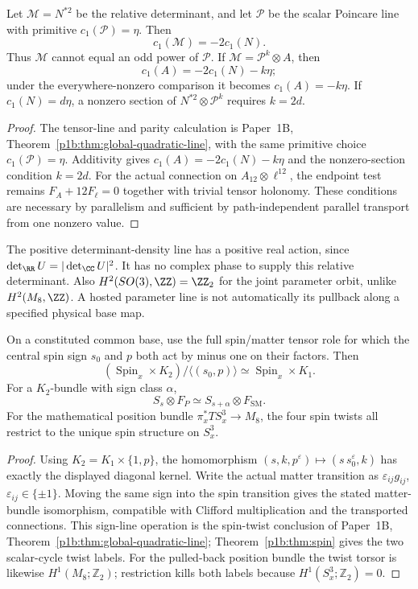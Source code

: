 \documentclass[12pt,a4paper]{article}
\begin{document}
\begin{proposition}
\label{p5:prop:relative-determinant-poincare-parity}
Let \(\mathcal M=N^{*2}\) be the relative determinant,
and let \(\mathcal P\) be the scalar Poincare line with
primitive \(c_1(\mathcal P)=\eta\).  Then
\[
 c_1(\mathcal M)=-2c_1(N).
\]
Thus \(\mathcal M\) cannot equal an odd power of
\(\mathcal P\).  If
\(\mathcal M=\mathcal P^k\otimes A\), then
\[
 c_1(A)=-2c_1(N)-k\eta;
\]
under the everywhere-nonzero comparison it becomes
\(c_1(A)=-k\eta\).  If \(c_1(N)=d\eta\), a nonzero
section of \(N^{*2}\otimes\mathcal P^k\) requires
\(k=2d\).
\end{proposition}
\begin{proof}
The tensor-line and parity calculation is Paper~1B,
Theorem~\ref{p1b:thm:global-quadratic-line}, with the same primitive
choice $c_1(\mathcal P)=\eta$. Additivity gives
$c_1(A)=-2c_1(N)-k\eta$ and the nonzero-section condition $k=2d$.
For the actual connection on $A_{12}\otimes\ell^{12}$, the endpoint
test remains $F_A+12F_\ell=0$ together with trivial tensor holonomy.
These conditions are necessary by parallelism and sufficient by
path-independent parallel transport from one nonzero value.
\end{proof}

The positive determinant-density line has a positive real
action, since \(\det_{\RR}U=|\det_{\CC}U|^2\).
It has no complex phase to supply this relative
determinant.  Also \(H^2(SO(3),\ZZ)=\ZZ_2\) for the
joint parameter orbit, unlike \(H^2(M_8,\ZZ)\).
A hosted parameter line is not automatically its
pullback along a specified physical base map.

\begin{proposition}
\label{p5:prop:quadratic-sign-spin-matter-incidence}
On a constituted common base, use the full spin/matter
tensor role for which the central spin sign \(s_0\)
and \(p\) both act by minus one on their factors.
Then
\[
 (\operatorname{Spin}_x\times K_2)/\langle(s_0,p)\rangle
       \simeq\operatorname{Spin}_x\times K_1.
\]
For a \(K_2\)-bundle with sign class \(\alpha\),
\[
 S_s\otimes F_P\simeq S_{s+\alpha}\otimes F_{\mathrm{SM}}.
\]
For the mathematical position bundle
\(\pi_x^*TS_x^3\to M_8\), the four spin twists all
restrict to the unique spin structure on \(S_x^3\).
\end{proposition}
\begin{proof}
Using $K_2=K_1\times\{1,p\}$, the homomorphism
$(s,k,p^\varepsilon)\mapsto(s\,s_0^\varepsilon,k)$ has exactly the
displayed diagonal kernel. Write the actual matter transition as
$\varepsilon_{ij}g_{ij}$, $\varepsilon_{ij}\in\{\pm1\}$. Moving the
same sign into the spin transition gives the stated matter-bundle
isomorphism, compatible with Clifford multiplication and the transported
connections. This sign-line operation is the spin-twist conclusion of
Paper~1B, Theorem~\ref{p1b:thm:global-quadratic-line};
Theorem~\ref{p1b:thm:spin} gives the two scalar-cycle twist labels.
For the pulled-back position bundle the twist torsor is likewise
$H^1(M_8;\mathbb Z_2)$; restriction kills both labels because
$H^1(S_x^3;\mathbb Z_2)=0$.
\end{proof}
\end{document}
